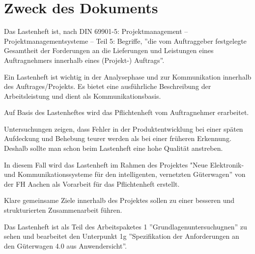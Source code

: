 \section*{Zweck des Dokuments}
Das Lastenheft ist, nach \acrshort{DIN} 69901-5: Projektmanagement – Projektmanagementsysteme – Teil 5: Begriffe, ''die vom Auftraggeber festgelegte Gesamtheit der Forderungen an die Lieferungen und Leistungen eines Auftragnehmers innerhalb eines (Projekt-) Auftrags''\cite{DIN69901-5}.\par
Ein Lastenheft ist wichtig in der Analysephase und zur Kommunikation innerhalb des Auftrages/Projekts. Es bietet eine ausführliche Beschreibung der Arbeitsleistung und dient als Kommunikationsbasis.\par
Auf Basis des Lastenheftes wird das Pflichtenheft vom Auftragnehmer erarbeitet.\par
Untersuchungen zeigen, dass Fehler in der Produktentwicklung bei einer späten Aufdeckung und Behebung teurer werden als bei einer früheren Erkennung. Deshalb sollte man schon beim Lastenheft eine hohe Qualität anstreben.\cite{pmblog}\par
In diesem Fall wird das Lastenheft im Rahmen des Projektes "Neue Elektronik- und Kommunikationssysteme für den intelligenten, vernetzten Güterwagen'' von der FH Aachen als Vorarbeit für das Pflichtenheft erstellt. \par
Klare gemeinsame Ziele innerhalb des Projektes sollen zu einer besseren und strukturierten Zusammenarbeit führen.\par
Das Lastenheft ist als Teil des Arbeitspaketes 1 ''Grundlagenuntersuchugnen'' zu sehen und bearbeitet den Unterpunkt 1g ''Spezifikation der Anforderungen an den Güterwagen 4.0 aus Anwendersicht''.
